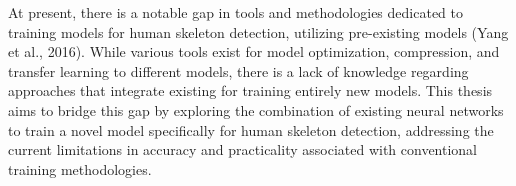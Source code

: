 At present, there is a notable gap in tools and methodologies dedicated to training models for human skeleton detection, utilizing pre-existing models (\scc Yang et al., 2016). While various tools exist for model optimization, compression, and transfer learning to different models, there is a lack of knowledge regarding approaches that integrate existing \NN\s for training entirely new models. This thesis aims to bridge this gap by exploring the combination of existing neural networks to train a novel model specifically for human skeleton detection, addressing the current limitations in accuracy and practicality associated with conventional training methodologies.

